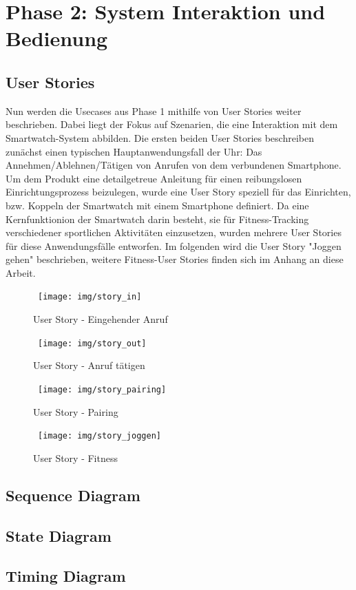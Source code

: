 \chapter{Phase 2: System Interaktion und Bedienung}

\section{User Stories}

Nun werden die Usecases aus Phase 1 mithilfe von User Stories weiter beschrieben. Dabei liegt der Fokus auf Szenarien, die eine Interaktion mit dem Smartwatch-System abbilden.
Die ersten beiden User Stories beschreiben zunächst einen typischen Hauptanwendungsfall der Uhr: Das Annehmen/Ablehnen/Tätigen von Anrufen von dem verbundenen Smartphone.
Um dem Produkt eine detailgetreue Anleitung für einen reibungslosen Einrichtungsprozess beizulegen, wurde eine User Story speziell für das Einrichten, bzw. Koppeln der Smartwatch mit einem Smartphone definiert.
Da eine Kernfunktionion der Smartwatch darin besteht, sie für Fitness-Tracking verschiedener sportlichen Aktivitäten einzusetzen, wurden mehrere User Stories für diese Anwendungsfälle entworfen. Im folgenden wird die User Story "Joggen gehen" beschrieben, weitere Fitness-User Stories finden sich im Anhang an diese Arbeit.
\begin{figure}[H]
\centering\
\texttt{[image: img/story\_in]}
\caption{User Story - Eingehender Anruf}\label{fig:story-in}
\end{figure}
\begin{figure}[H]
\centering\
\texttt{[image: img/story\_out]}
\caption{User Story - Anruf tätigen}\label{fig:story-out}
\end{figure}
\begin{figure}[H]
\centering\
\texttt{[image: img/story\_pairing]}
\caption{User Story - Pairing}\label{fig:story-pairing}
\end{figure}
\begin{figure}[H]
\centering\
\texttt{[image: img/story\_joggen]}
\caption{User Story - Fitness}\label{fig:story-joggen}
\end{figure}

\section{Sequence Diagram}

\section{State Diagram}

\section{Timing Diagram}

